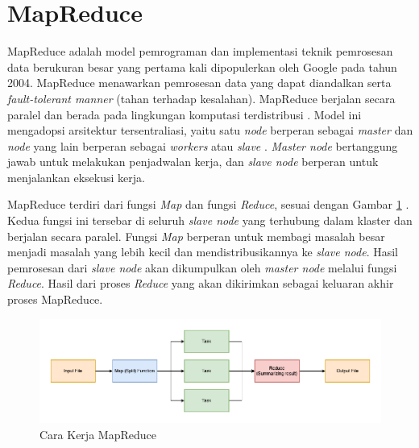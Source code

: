 \section{MapReduce}
MapReduce adalah model pemrograman dan implementasi teknik pemrosesan data berukuran besar yang pertama kali dipopulerkan oleh Google pada tahun 2004\cite{kaliaAnalysisHadoopMapReduce2021}. MapReduce menawarkan pemrosesan data yang dapat diandalkan serta \textit{fault-tolerant manner} (tahan terhadap kesalahan).  MapReduce berjalan secara paralel dan berada pada lingkungan komputasi terdistribusi \cite{cTaskFailureResilience2020}. Model ini mengadopsi arsitektur tersentraliasi, yaitu satu \textit{node} berperan sebagai \textit{master} dan \textit{node} yang lain berperan sebagai \textit{workers} atau \textit{slave} \cite{herodotouHadoopPerformanceModels2011, bakratsasHadoopMapReducePerformance2018}. \textit{Master node} bertanggung jawab untuk melakukan penjadwalan kerja, dan \textit{slave node} berperan untuk menjalankan eksekusi kerja. 

MapReduce terdiri dari fungsi \textit{Map} dan fungsi \textit{Reduce}, sesuai dengan Gambar \ref{fig:mapreduce-flow} \cite{gandomiHybSMRPHybridScheduling2019}. Kedua fungsi ini tersebar di seluruh \textit{slave node} yang terhubung dalam klaster dan berjalan secara paralel. Fungsi \textit{Map} berperan untuk membagi masalah besar menjadi masalah yang lebih kecil dan mendistribusikannya ke \textit{slave node}. Hasil pemrosesan dari \textit{slave node} akan dikumpulkan oleh \textit{master node} melalui fungsi \textit{Reduce}. Hasil dari proses \textit{Reduce} yang akan dikirimkan sebagai keluaran akhir proses MapReduce.  

\begin{figure}[h!]
    \centering
    \includegraphics[width=1\textwidth]{figures/ch02/mapreduce-scheme.png}
    \caption{Cara Kerja MapReduce}
    \label{fig:mapreduce-flow}
\end{figure}
